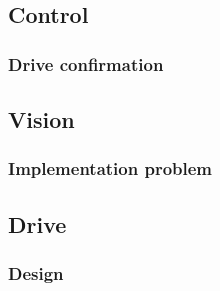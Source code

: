 \documentclass[11pt, a4paper]{article}
\begin{document}
\pagebreak
\subsection{Control}







\subsubsection{Drive confirmation}



\pagebreak
\subsection{Vision}



\subsubsection{Implementation problem}


\pagebreak
\subsection{Drive}
\subsubsection{Design}
\end{document}

